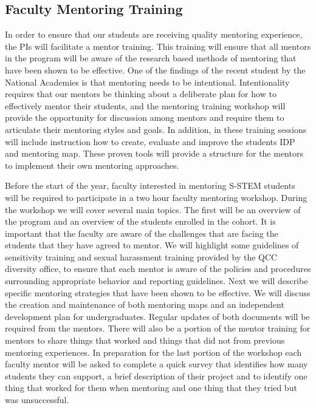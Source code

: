 \documentclass[12pt]{article}
\begin{document}
\vspace{-5mm}

\subsection{\normalsize{Faculty Mentoring Training}}\label{sect:facultytraining}
\vspace{-2mm}

In order to ensure that our students are receiving quality mentoring experience, the PIs will facilitate a mentor training.  This training will ensure that all mentors in the program will be aware of the research based methods of mentoring that have been shown to be effective.  One of the findings of the recent student by the National Academies is that mentoring needs to be intentional.  Intentionality requires that our mentors be thinking about a deliberate plan for how to effectively mentor their students, and the mentoring training workshop will provide the opportunity for discussion among mentors and require them to articulate their mentoring styles and goals. %
 In addition, in these training sessions will include instruction how to create, evaluate and improve the students IDP and mentoring map. These proven tools will provide a structure for the mentors to implement their own mentoring approaches.  

Before the start of the year, faculty interested in mentoring S-STEM students will be required to participate in a two hour faculty mentoring workshop.  During the workshop we will cover several main topics.  The first will be an overview of the program and an overview of the students enrolled in the cohort.  It is important that the faculty are aware of the challenges that are facing the students that they have agreed to mentor.  We will highlight some guidelines of sensitivity training and sexual harassment training provided by the  QCC diversity office, to ensure that each mentor is aware of the policies and procedures surrounding appropriate behavior and reporting guidelines.  Next we will describe specific mentoring strategies that have been shown to be effective. We will discuss the creation and maintenance of both mentoring maps and an independent development plan for undergraduates.  %
Regular updates of both documents will be required from the mentors.  %
There will also be a portion of the mentor training for mentors to share things that worked and things that did not from previous mentoring experiences.  In preparation for the last portion of the workshop each faculty mentor will be asked to complete a quick survey that identifies how many students they can support, a brief description of their project and to identify one thing that worked for them when mentoring and one thing that they tried but was unsuccessful. 
\end{document}
